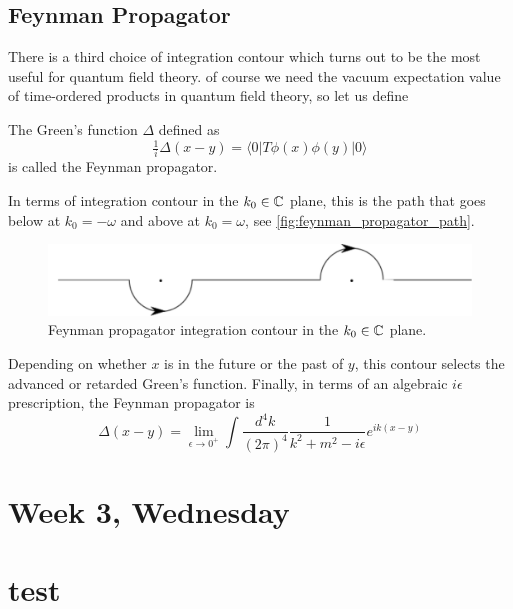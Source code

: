 \documentclass[12pt]{article}
\begin{document}
\subsection{Feynman Propagator}

There is a third choice of integration contour which turns out to be
the most useful for quantum field theory. of course we need the vacuum
expectation value of time-ordered products in quantum field theory, so
let us define
\begin{definition}
  The Green's function $\Delta$ defined as 
  \begin{equation}
    \tfrac{1}{i} \Delta(x-y) = 
    \langle 0 | T \phi(x) \phi(y) |0\rangle
  \end{equation}
  is called the Feynman propagator.
\end{definition}
In terms of integration contour in the $k_0\in {\mathbb{C}}$ plane, this is the
path that goes below at $k_0=-\omega$ and above at $k_0=\omega$, see
\autoref{fig:feynman_propagator_path}. 
\begin{figure}
  \label{fig:feynman_propagator_path}
  \centering
  \includegraphics[width=\linewidth]{figures/FeynmanPropagatorPath.pdf}
  \caption{Feynman propagator integration contour in the $k_0\in {\mathbb{C}}$ plane.}
\end{figure}
Depending on whether $x$ is in the future or the past of $y$, this
contour selects the advanced or retarded Green's function. Finally, in
terms of an algebraic $i\epsilon$ prescription, the Feynman propagator
is
\begin{equation}
  \Delta(x-y) = 
  \lim_{\epsilon \to 0^+}
  \int
  \frac{d^4k}{(2\pi)^4}
  \frac{1}{k^2 + m^2 - i \epsilon}
  e^{ik(x-y)}
\end{equation}




\section{Week 3, Wednesday}






\newpage
\appendix

\section{test}



 
\renewcommand{\refname}{Bibliography}

\end{document}
